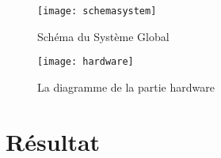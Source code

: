 \begin{figure}[tb]
	\label{fig:system}
	\centering
	\texttt{[image: schemasystem]}
	\caption{Schéma du Système Global \cite{Brisebard2015}}
\end{figure}

\begin{figure}[tb]
	\label{fig:hardware}
	\centering
	\texttt{[image: hardware]}
	\caption{La diagramme de la partie hardware}
\end{figure}

\section{Résultat}

\blindtext